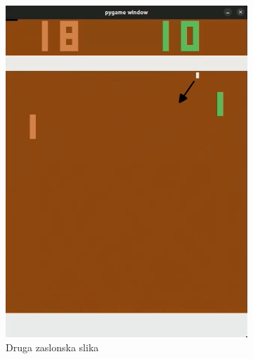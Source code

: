 \documentclass[cover]{thesis}
\begin{document}
\begin{figure}[H]
\begin{subfigure}{0.495\linewidth}
        \includegraphics[width=\textwidth]{FirstHit.png}
        \caption{Druga zaslonska slika}\label{fig:firstHit}
    \end{subfigure}
    \begin{subfigure}{0.495\linewidth}
        \centering

\end{subfigure}
\end{figure}
\end{document}
